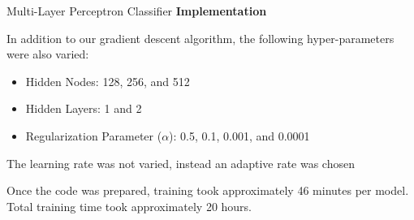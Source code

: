 \documentclass[titlepage,leqno]{beamer}%
\begin{document}
\begin{frame}{Multi-Layer Perceptron Classifier}
\small
\textbf{Implementation}

\medskip

In addition to our gradient descent algorithm, the following hyper-parameters were also varied:
\begin{itemize}
	\item Hidden Nodes: 128, 256, and 512
	\item Hidden Layers: 1 and 2
	\item Regularization Parameter ($\alpha$): 0.5, 0.1, 0.001, and 0.0001
\end{itemize}
\medskip
The learning rate was not varied, instead an adaptive rate was chosen %

\medskip

Once the code was prepared, training took approximately 46 minutes per model. Total training time took approximately 20 hours.

\end{frame}
\end{document}
